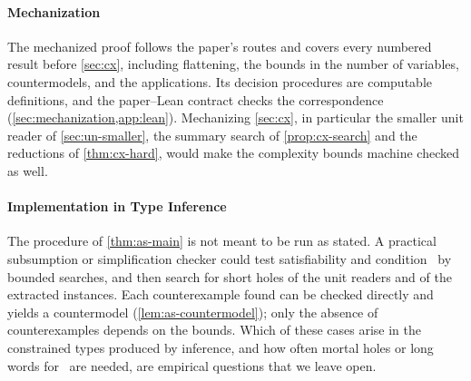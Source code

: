 \paragraph{Mechanization}
The mechanized proof follows the paper's routes and covers every numbered
result before \cref{sec:cx}, including flattening, the bounds in the number
of variables, countermodels, and the applications. Its decision procedures
are computable definitions, and the paper--Lean contract checks the
correspondence (\cref{sec:mechanization,app:lean}). Mechanizing
\cref{sec:cx}, in particular the smaller unit reader of
\cref{sec:un-smaller}, the summary search of \cref{prop:cx-search} and the
reductions of \cref{thm:cx-hard}, would make the complexity bounds machine
checked as well.

\paragraph{Implementation in Type Inference}
The procedure of \cref{thm:as-main} is not meant to be run as stated. A
practical subsumption or simplification checker could test satisfiability and
condition \CondI\ by bounded searches, and then search for short holes of the
unit readers and of the extracted instances. Each counterexample found can be
checked directly and yields a countermodel (\cref{lem:as-countermodel}); only
the absence of counterexamples depends on the bounds. Which of these cases arise in the constrained types produced by
inference, and how often mortal holes or long words for \CondU\ are needed, are
empirical questions that we leave open.
